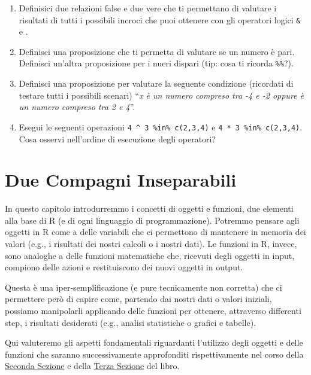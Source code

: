 \documentclass[
]{book}
\providecommand{\tightlist}{%
  \setlength{\itemsep}{0pt}\setlength{\parskip}{0pt}}
\begin{document}
\begin{enumerate}
\def\labelenumi{\arabic{enumi}.}
\tightlist
\item
  Definisici due relazioni false e due vere che ti permettano di valutare i risultati di tutti i possibili incroci che puoi ottenere con gli operatori logici \texttt{\&} e \texttt{\textbar{}}.
\item
  Definisci una proposizione che ti permetta di valutare se un numero è pari. Definisci un'altra proposizione per i nueri dispari (tip: cosa ti ricorda \texttt{\%\%}?).
\item
  Definisci una proposizione per valutare la seguente condizione (ricordati di testare tutti i possibili scenari) ``\emph{x è un numero compreso tra -4 e -2 oppure è un numero compreso tra 2 e 4}''.
\item
  Esegui le seguenti operazioni \texttt{4\ \^{}\ 3\ \%in\%\ c(2,3,4)} e \texttt{4\ *\ 3\ \%in\%\ c(2,3,4)}. Cosa osservi nell'ordine di esecuzione degli operatori?
\end{enumerate}

\hypertarget{objects-functions}{%
\chapter{Due Compagni Inseparabili}\label{objects-functions}}

In questo capitolo introdurremmo i concetti di oggetti e funzioni, due elementi alla base di R (e di ogni linguaggio di programmazione). Potremmo pensare agli oggetti in R come a delle variabili che ci permettono di mantenere in memoria dei valori (e.g., i risultati dei nostri calcoli o i nostri dati). Le funzioni in R, invece, sono analoghe a delle funzioni matematiche che, ricevuti degli oggetti in input, compiono delle azioni e restituiscono dei nuovi oggetti in output.

Questa è una iper-semplificazione (e pure tecnicamente non corretta) che ci permettere però di capire come, partendo dai nostri dati o valori iniziali, possiamo manipolarli applicando delle funzioni per ottenere, attraverso differenti step, i risultati desiderati (e.g., analisi statistiche o grafici e tabelle).

Qui valuteremo gli aspetti fondamentali riguardanti l'utilizzo degli oggetti e delle funzioni che saranno successivamente approfonditi rispettivamente nel corso della \protect\hyperlink{second-section}{Seconda Sezione} e della \protect\hyperlink{third-section}{Terza Sezione} del libro.
\end{document}
